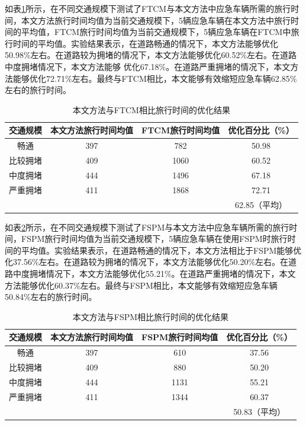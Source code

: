如表\ref{table:travel_time_my_FTCM}所示，在不同交通规模下测试了FTCM与本文方法中应急车辆所需的旅行时间，本文方法旅行时间均值为当前交通规模下，5辆应急车辆在本文方法中旅行时间的平均值，FTCM旅行时间均值为当前交通规模下，5辆应急车辆在FTCM中旅行时间的平均值。实验结果表示，在道路畅通的情况下，本文方法能够优化50.98\%左右。在道路较为拥堵的情况下，本文方法能够优化60.52\%左右。在道路中度拥堵情况下，本文方法能够 优化67.18\%。在道路严重拥堵的情况下，本文方法能够优化72.71\%左右。最终与FTCM相比，本文能够有效缩短应急车辆62.85\%左右的旅行时间。

\begin{table}[H]
	\centering
	\caption{本文方法与FTCM相比旅行时间的优化结果}
	\label{table:travel_time_my_FTCM}
	\begin{tabular}{|c|c|c|c|}
		\hline
		交通规模  & 本文方法旅行时间均值 & FTCM旅行时间均值 & 优化百分比（\%） \\ \hline
		畅通     & 397      & 782     & 50.98  \\ \hline
		比较拥堵 & 409      & 1060    & 60.52  \\ \hline
		中度拥堵 & 444      & 1496    & 67.18  \\ \hline
		严重拥堵 & 411      & 1868    & 72.71  \\ \hline
		  &  &  & 62.85（平均） \\ \hline
	\end{tabular}
\end{table}


如表\ref{table:travel_time_my_FSPM}所示，在不同交通规模下测试了FSPM与本文方法中应急车辆所需的旅行时间，FSPM旅行时间均值为当前交通规模下，5辆应急车辆在使用FSPM时旅行时间的平均值。实验结果表示，在道路畅通的情况下，本文方法相比于FSPM能够优化37.56\%左右。在道路较为拥堵的情况下，本文方法能够优化50.20\%左右。在道路中度拥堵情况下，本文方法能够优化55.21\%。在道路严重拥堵的情况下，本文方法能够优化60.37\%左右。最终与FSPM相比，本文能够有效缩短应急车辆50.84\%左右的旅行时间。

\begin{table}[H]
	\centering
	\caption{本文方法与FSPM相比旅行时间的优化结果}
	\label{table:travel_time_my_FSPM}
	\begin{tabular}{|c|c|c|c|}
		\hline
		交通规模 & 本文方法旅行时间均值 & FSPM旅行时间均值\cite{min} & 优化百分比（\%） \\ \hline
		畅通     & 397 & 610  & 37.56                      \\ \hline
		比较拥堵 & 409 & 880  & 50.20                      \\ \hline
		中度拥堵 & 444 & 1131 & 55.21                      \\ \hline
		严重拥堵 & 411 & 1344 & 60.37                      \\ \hline
		  &  &  & 50.83（平均） \\ \hline
	\end{tabular}
\end{table}

